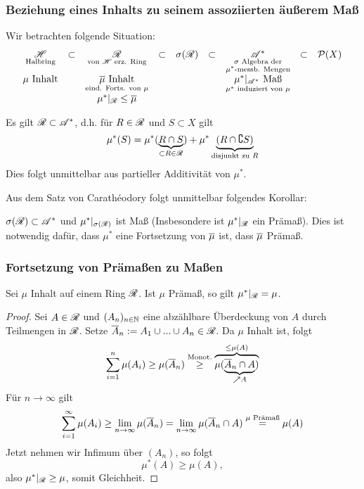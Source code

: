 \subsubsection{Beziehung eines Inhalts zu seinem assoziierten äußerem Maß}
Wir betrachten folgende Situation:
\begin{equation*}
\begin{array}{ccccccccc}
\underset{\text{Halbring}}{\mathscr{H}} & \subset & \underset{\text{von } \mathscr{H} \text{ erz. Ring}}{\mathscr{R}} & \subset &\sigma(\mathscr{R})& \subset & \underset{\substack{\sigma \text{ Algebra der} \\ \mu^*\text{-messb. Mengen}}}{\mathscr{A}^*} & \subset & \mathcal{P}(X)\\
\mu \text{ Inhalt} && \underset{\text{eind. Forts. von }\mu}{\overline\mu \text{ Inhalt}} &&&& \underset{\mu^* \text{ induziert von } \mu}{\mu^*|_{\mathscr{A}^*} \text{ Maß}} \\
&& \mu^*|_{\mathscr{R}} \leq \overline\mu
\end{array}
\end{equation*}
\begin{beobachtung}
Es gilt $\mathscr{R} \subset \mathscr{A}^*$, d.h. für $R \in \mathscr{R}$ und $S \subset X$ gilt
$$
\mu^*(S) = \mu^*(\underbrace{R \cap S}_{\subset R \in \mathscr{R}}) + \mu^* \underbrace{(R \cap \complement S)}_{\text{disjunkt zu } R}
$$
Dies folgt unmittelbar aus partieller Additivität von $\mu^*$.
\end{beobachtung}
Aus dem Satz von Carathéodory folgt unmittelbar folgendes Korollar:
\begin{korollar}
\begin{mdframed}
$\sigma(\mathscr{R}) \subset \mathscr{A}^*$ und $\mu^*|_{\sigma (\mathscr{R})}$ ist Maß (Insbesondere ist $\mu^*|_{\mathscr{R}}$ ein Prämaß). Dies ist notwendig dafür, dass $\mu^*$ eine Fortsetzung von $\overline\mu$ ist, dass $\overline\mu$ Prämaß.
\end{mdframed}
\end{korollar}

\subsubsection{Fortsetzung von Prämaßen zu Maßen}
\begin{lemma}
\begin{mdframed}
Sei $\mu$ Inhalt auf einem Ring $\mathscr{R}$. Ist $\mu$ Prämaß, so gilt $\mu^*|_{\mathscr{R}} = \mu$.
\end{mdframed}
\begin{proof}
Sei $A \in \mathscr{R}$ und $(A_n)_{n \in \mathbb{N}}$ eine abzählbare Überdeckung von $A$ durch Teilmengen in $\mathscr{R}$. Setze $\overline{A}_n:=A_1 \cup ... \cup A_n \in \mathscr{R}$. Da $\mu$ Inhalt ist, folgt
$$
\sum_{i=1}^n \mu(A_i) \geq \mu (\overline{A}_n) \overset{\text{Monot.}}\geq  \overbrace{\mu(\underbrace{\overline{A}_n \cap A}_{\nearrow A})}^{\leq \mu(A)}
$$
Für $n \longrightarrow \infty$ gilt
$$
\sum_{i=1}^\infty \mu(A_i)\geq \lim_{n \to \infty} \mu(\overline{A}_n) = \lim_{n \to \infty} \mu(\overline{A}_n \cap A) \overset{\mu \text{ Prämaß}}= \mu(A)
$$
Jetzt nehmen wir Infimum über $(A_n)$, so folgt
$$ \mu^*(A) \geq \mu(A),$$
also $\mu^*|_{\mathscr{R}} \geq \mu$, somit Gleichheit.
\end{proof}
\end{lemma}

